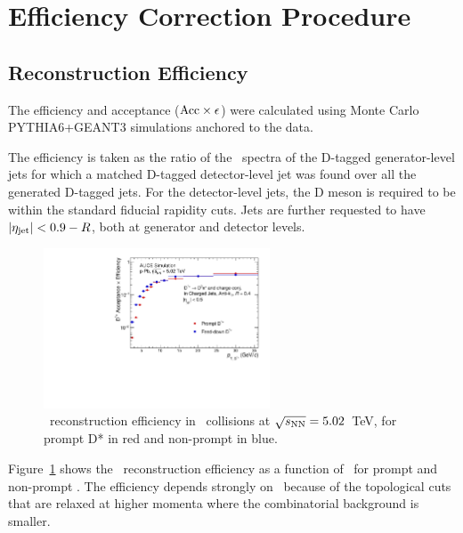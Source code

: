 
\section{Efficiency Correction Procedure}

\subsection{Reconstruction Efficiency}
\label{sect:sub_DmesonRecEff}
The efficiency and acceptance (${\rm Acc} \times \epsilon$) were calculated using Monte Carlo PYTHIA6+GEANT3 simulations anchored to the data.

The efficiency is taken as the ratio of the \ptd\ spectra of the D-tagged generator-level jets for which a matched
D-tagged detector-level jet was found over all the generated D-tagged jets.
For the detector-level jets, the D meson is required to be within the standard fiducial rapidity cuts.
Jets are further requested to have $|\eta_{\rm jet}| < 0.9 - R$, both at generator and detector levels.


\begin{figure}[bth]
\centering
\includegraphics[width=0.6\textwidth]{pPbplots/DjetEff_Sim_log}
\caption{\Dstar\  reconstruction efficiency in \pPb\ collisions at $\sqrt{s_{\rm NN}}=5.02$~TeV, for prompt D* in red and non-prompt in blue.}
\label{eq_pPb_DrecEff}
\end{figure}

Figure~\ref{eq_pPb_DrecEff} shows the \Dstar\ reconstruction efficiency as a function of \ptd\, for prompt and non-prompt \Dstar. The efficiency depends strongly on \ptd\ because of the topological cuts that are relaxed at higher momenta where the combinatorial background is smaller. 

